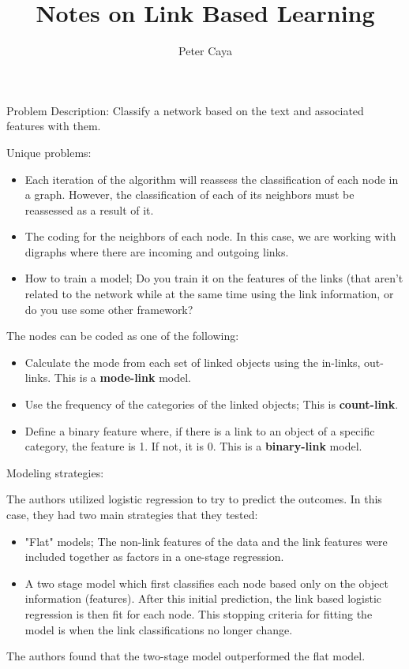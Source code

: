 \documentclass[10pt,a4paper]{book}
\author{Peter Caya}
\title{Notes on Link Based Learning}
\begin{document}
Problem Description: Classify a network based on the text and associated features with them.


Unique problems:
\begin{itemize}
\item Each iteration of the algorithm will reassess the classification of each node in a graph. However, the classification of each of its neighbors must be reassessed as a result of it.
\item The coding for the neighbors of each node. In this case, we are working with digraphs where there are incoming and outgoing links.  
\item How to train a model; Do you train it on the features of the links (that aren't related to the network while at the same time using the link information, or do you use some other framework?
\end{itemize}


The nodes can be coded as one of the following:

\begin{itemize}
\item Calculate the mode from each set of linked objects using the in-links, out-links. This is a \textbf{mode-link} model.
\item Use the frequency of the categories of the linked objects; This is \textbf{count-link}.
\item Define a binary feature where, if there is a link to an object of a specific category, the feature is 1. If not, it is 0. This is a \textbf{binary-link} model.
\end{itemize}


Modeling strategies:

The authors utilized logistic regression to try to predict the outcomes. In this case, they had two main strategies that they tested:

\begin{itemize}
\item "Flat" models; The non-link features of the data and the link features were included together as factors in a one-stage regression. 
\item A two stage model which first classifies each node based only on the object information (features). After this initial prediction, the link based logistic regression is then fit for each node. This stopping criteria for fitting the model is when the link classifications no longer change.
\end{itemize}

The authors found that the two-stage model outperformed the flat model.
\end{document}
